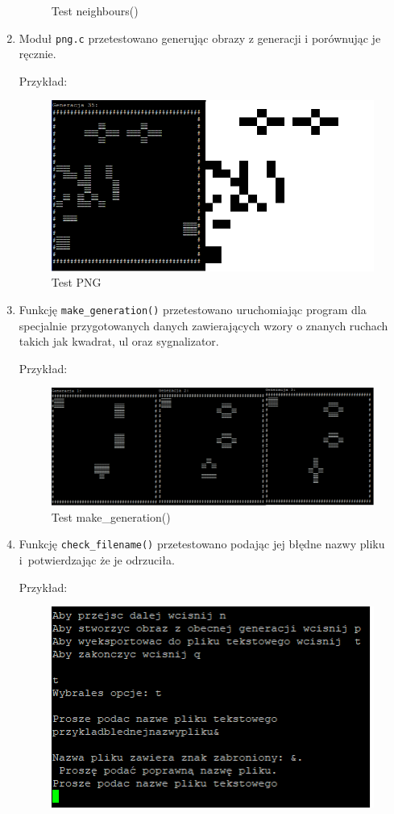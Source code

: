 \documentclass[12pt]{report}
\newcommand{\code}[1]{\texttt{#1}}
\begin{document}
\begin{enumerate}
\begin{figure}[H]
\caption{Test neighbours()}
\label{test neighbours}
\end{figure}
\item Moduł \code{png.c} przetestowano generując obrazy z generacji i porównując je ręcznie.\par
Przykład:
\begin{figure}[H]
\centering
\includegraphics[width=14cm]{obrazy/testpng.png}
\caption{Test PNG}
\label{test png}
\end{figure}
\item Funkcję \code{make\_generation()} przetestowano uruchomiając program dla specjalnie przygotowanych danych zawierających wzory o znanych ruchach takich jak kwadrat, ul oraz sygnalizator.\par
Przykład:
\begin{figure}[H]
\centering
\includegraphics[width=14cm]{obrazy/testmakegen.png}
\caption{Test make\_generation()}
\label{test make_generation}
\end{figure}
\item Funkcję \code{check\_filename()} przetestowano podając jej błędne nazwy pliku i~potwierdzając że je odrzuciła.\par
Przykład:
\begin{figure}[H]
\centering
\includegraphics[width=14cm]{obrazy/testcheckname.png}

\end{figure}
\end{enumerate}
\end{document}
